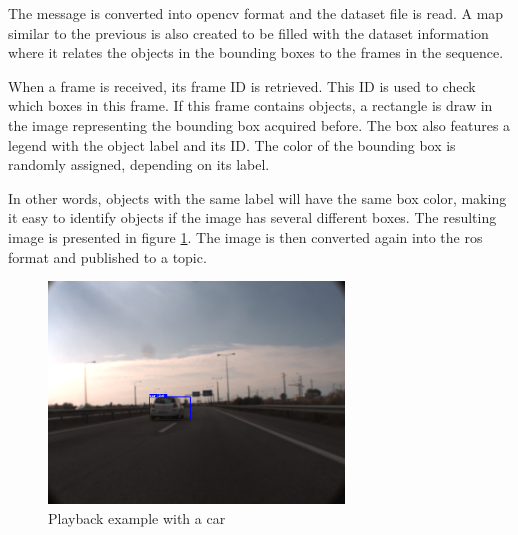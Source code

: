 The message is converted into \gls{opencv} format and the dataset file is read. A map similar to the previous is also created to be filled with the dataset information where it relates the objects in the bounding boxes to the frames in the sequence. 

When a frame is received, its frame ID is retrieved. This ID is used to check which boxes in this frame. If this frame contains objects, a rectangle is draw in the image representing the bounding box acquired before. The box also features a legend with the object label and its ID. The color of the bounding box is randomly assigned, depending on its label. 

In other words, objects with the same label will have the same box color, making it easy to identify objects if the image has several different boxes. The resulting image is presented in figure \ref{fig:playback}. The image is then converted again into the \gls{ros} format and published to a topic.

\begin{figure}[htp]
	
	\centering
	\includegraphics[width=0.7\textwidth]{caplabel/imgs/playback.png}
	
	\caption{Playback example with a car}
	\label{fig:playback}
	
\end{figure}